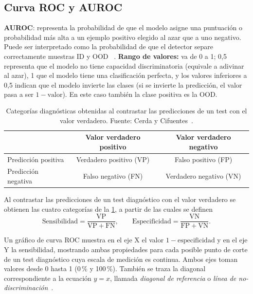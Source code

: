 \subsection{Curva ROC y AUROC}\label{sec:auroc}

\textbf{AUROC}: representa la probabilidad de que el modelo asigne una puntuación o probabilidad más alta a un ejemplo positivo elegido al azar que a uno negativo. 
Puede ser interpretado como la probabilidad de que el detector separe correctamente muestras ID y OOD ~\cite{openood15}.
\textbf{Rango de valores:} va de 0 a 1; 0,5 representa que el modelo no tiene capacidad discriminatoria (equivale a adivinar al azar), 1 que el modelo tiene una clasificación perfecta, y los valores inferiores a 0,5 indican que el modelo invierte las clases (si se invierte la predicción, el valor pasa a ser $1 - \text{valor}$). En este caso también la clase positiva es la OOD.


\begin{table}[H]
  \centering
  \caption{Categorías diagnósticas obtenidas al contrastar las predicciones de un test con el valor verdadero. Fuente: Cerda y Cifuentes~\cite{cerda2012roc}.}
  \label{tab:categorias-diagnosticas}
  \begin{tabular*}{\linewidth}{@{\extracolsep{\fill}}lcc}
    \toprule
    & Valor verdadero positivo & Valor verdadero negativo \\
    \midrule
    Predicción positiva & Verdadero positivo (VP) & Falso positivo (FP) \\
    Predicción negativa & Falso negativo (FN) & Verdadero negativo (VN) \\
    \bottomrule
  \end{tabular*}
\end{table}

Al contrastar las predicciones de un test diagnóstico con el valor verdadero se obtienen las cuatro categorías de la \cref{tab:categorias-diagnosticas}, a partir de las cuales se definen~\cite{cerda2012roc}
\[
  \text{Sensibilidad} = \frac{\mathrm{VP}}{\mathrm{VP} + \mathrm{FN}}, \qquad
  \text{Especificidad} = \frac{\mathrm{VN}}{\mathrm{FP} + \mathrm{VN}}.
\]

\begin{definicion}\label{def:roc}
Un gráfico de curva ROC muestra en el eje X el valor $1 - \text{especificidad}$ y en el eje Y la sensibilidad, mostrando ambas propiedades para cada posible punto de corte de un test diagnóstico cuya escala de medición es continua. Ambos ejes toman valores desde 0 hasta 1 (0\,\% y 100\,\%). También se traza la diagonal correspondiente a la ecuación $y = x$, llamada \emph{diagonal de referencia} o \emph{línea de no-discriminación}~\cite{cerda2012roc,fawcett2006}.
\end{definicion}

